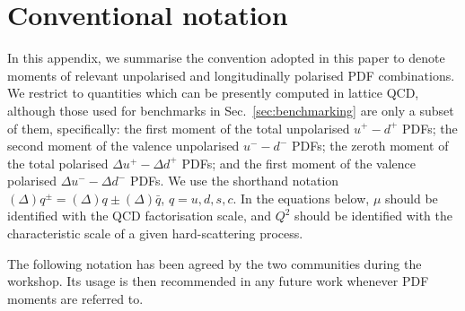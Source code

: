 \section{Conventional notation}

In this appendix, we summarise the convention adopted in this paper to denote 
moments of relevant unpolarised and longitudinally polarised PDF combinations.
%
We restrict to quantities which can be presently computed in lattice QCD,
although those used for benchmarks in Sec.~\ref{sec:benchmarking} are only
a subset of them, specifically: the first moment of the total unpolarised
$u^+-d^+$ PDFs; the second moment of the valence unpolarised $u^--d^-$ PDFs;
the zeroth moment of the total polarised $\Delta u^+-\Delta d^+$ PDFs; 
and the first moment of the valence polarised $\Delta u^--\Delta d^-$ PDFs.
%
We use the shorthand notation $(\Delta)q^\pm=(\Delta)q\pm(\Delta)\bar{q}$,
$q=u,d,s,c$.
%
In the equations below, $\mu$ should be identified with the QCD factorisation scale,
and $Q^2$ should be identified with the characteristic scale of a given 
hard-scattering process.

The following notation has been agreed by the two communities 
during the workshop.
%
Its usage is then recommended in any future work 
whenever PDF moments are referred to.

